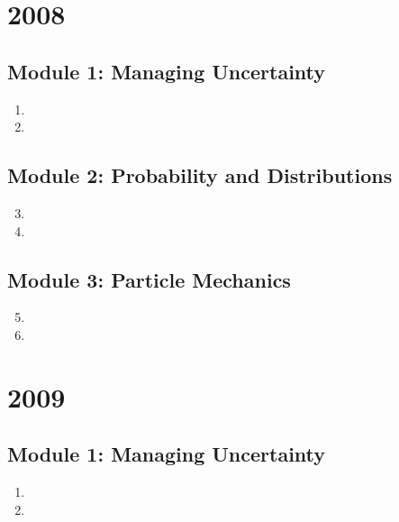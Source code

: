 \documentclass[fleqn,titlepage]{book}
\numberwithin{equation}{section}
\theoremstyle{plain}
\theoremstyle{definition}
\theoremstyle{remark}
\begin{document}
\chapter{2008}
\section{Module 1: Managing Uncertainty}
\begin{enumerate}[label=\bfseries  \arabic*.]\setcounter{enumi}{0}
\item 
\item 
\end{enumerate}
\section{Module 2: Probability and Distributions}
\begin{enumerate}[label=\bfseries  \arabic*.]\setcounter{enumi}{2}
\item 
\item 
\end{enumerate}
\section{Module 3: Particle Mechanics}
\begin{enumerate}[label=\bfseries  \arabic*.]\setcounter{enumi}{4}
\item 
\item 
\end{enumerate}


\chapter{2009}
\section{Module 1: Managing Uncertainty}
\begin{enumerate}[label=\bfseries  \arabic*.]\setcounter{enumi}{0}
\item 
\item 
\end{enumerate}
\end{document}
